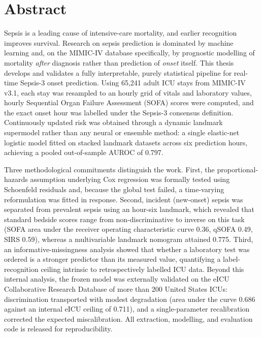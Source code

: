 \chapter*{Abstract}

Sepsis is a leading cause of intensive-care mortality, and earlier recognition
improves survival. Research on sepsis prediction is dominated by machine
learning and, on the MIMIC-IV database specifically, by prognostic modelling of
mortality \emph{after} diagnosis rather than prediction of \emph{onset} itself.
This thesis develops and validates a fully interpretable, purely statistical
pipeline for real-time Sepsis-3 onset prediction. Using 65{,}241 adult ICU
stays from MIMIC-IV v3.1, each stay was resampled to an hourly grid of vitals
and laboratory values, hourly Sequential Organ Failure Assessment (SOFA) scores
were computed, and the exact onset hour was labelled under the Sepsis-3
consensus definition. Continuously updated risk was obtained through a dynamic
landmark supermodel rather than any neural or ensemble method: a single
elastic-net logistic model fitted on stacked landmark datasets across six
prediction hours, achieving a pooled out-of-sample AUROC of 0.797.

Three methodological commitments distinguish the work. First, the
proportional-hazards assumption underlying Cox regression was formally tested
using Schoenfeld residuals and, because the global test failed, a time-varying
reformulation was fitted in response. Second, incident (new-onset) sepsis was
separated from prevalent sepsis using an hour-six landmark, which revealed that
standard bedside scores range from non-discriminative to inverse on this task
(SOFA area under the receiver operating characteristic curve 0.36, qSOFA 0.49,
SIRS 0.59), whereas a multivariable landmark nomogram attained 0.775. Third, an
informative-missingness analysis showed that whether a laboratory test was
ordered is a stronger predictor than its measured value, quantifying a
label-recognition ceiling intrinsic to retrospectively labelled ICU data.
Beyond this internal analysis, the frozen model was externally validated on the
eICU Collaborative Research Database of more than 200 United States ICUs: discrimination
transported with modest degradation (area under the curve 0.686 against an
internal eICU ceiling of 0.711), and a single-parameter recalibration corrected
the expected miscalibration. All extraction, modelling, and evaluation code is
released for reproducibility.
